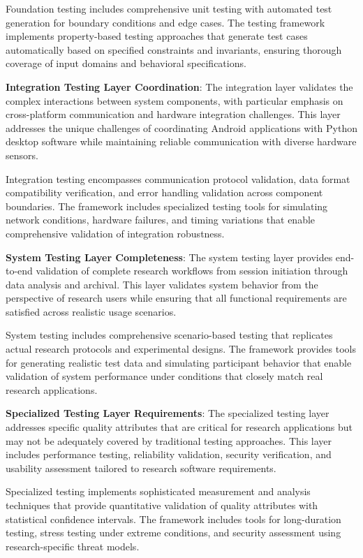 \documentclass[12pt,a4paper]{article}
\begin{document}
Foundation testing includes comprehensive unit testing with automated test generation for boundary conditions and edge
cases. The testing framework implements property-based testing approaches that generate test cases automatically based
on specified constraints and invariants, ensuring thorough coverage of input domains and behavioral specifications.

\textbf{Integration Testing Layer Coordination}: The integration layer validates the complex interactions between system
components, with particular emphasis on cross-platform communication and hardware integration challenges. This layer
addresses the unique challenges of coordinating Android applications with Python desktop software while maintaining
reliable communication with diverse hardware sensors.

Integration testing encompasses communication protocol validation, data format compatibility verification, and error
handling validation across component boundaries. The framework includes specialized testing tools for simulating network
conditions, hardware failures, and timing variations that enable comprehensive validation of integration robustness.

\textbf{System Testing Layer Completeness}: The system testing layer provides end-to-end validation of complete research
workflows from session initiation through data analysis and archival. This layer validates system behavior from the
perspective of research users while ensuring that all functional requirements are satisfied across realistic usage
scenarios.

System testing includes comprehensive scenario-based testing that replicates actual research protocols and experimental
designs. The framework provides tools for generating realistic test data and simulating participant behavior that enable
validation of system performance under conditions that closely match real research applications.

\textbf{Specialized Testing Layer Requirements}: The specialized testing layer addresses specific quality attributes that are
critical for research applications but may not be adequately covered by traditional testing approaches. This layer
includes performance testing, reliability validation, security verification, and usability assessment tailored to
research software requirements.

Specialized testing implements sophisticated measurement and analysis techniques that provide quantitative validation of
quality attributes with statistical confidence intervals. The framework includes tools for long-duration testing, stress
testing under extreme conditions, and security assessment using research-specific threat models.
\end{document}
